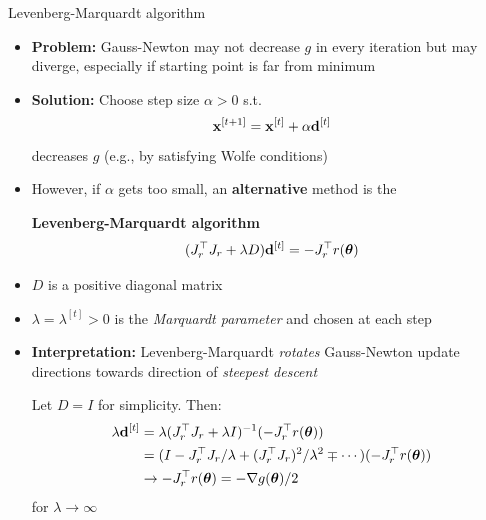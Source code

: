 \documentclass[11pt,compress,t,notes=noshow, xcolor=table]{beamer}
\begin{document}
\begin{vbframe}{Levenberg-Marquardt algorithm}

\begin{itemize}
    \item \textbf{Problem:} Gauss-Newton may not decrease $g$ in every iteration but may diverge, especially if starting point is far from minimum
    \item \textbf{Solution:} Choose step size $\alpha > 0$ s.t.
        \begin{equation*}
            \mathbf{x}^{[t+1]} = \mathbf{x}^{[t]} + \alpha \mathbf{d}^{[t]}
        \end{equation*}
        decreases $g$ (e.g., by satisfying Wolfe conditions)
    \item However, if $\alpha$ gets too small, an \textbf{alternative} method is the
        \begin{framed}
            \centering
            \textbf{Levenberg-Marquardt algorithm}
            \begin{equation*}
                (J_r^\top J_r + \lambda D) \mathbf{d}^{[t]} = -J_r^\top r(\bm{\theta})
            \end{equation*}
        \end{framed}
    \item $D$ is a positive diagonal matrix
    \item $\lambda = \lambda^{[t]} > 0$ is the \emph{Marquardt parameter} and chosen at each step
\end{itemize}

\framebreak

\begin{itemize}
    \item \textbf{Interpretation:} Levenberg-Marquardt \emph{rotates} Gauss-Newton update directions towards direction of \emph{steepest descent}
        \begin{framed}
            Let $D = I$ for simplicity.
            Then:
            \begin{align*}
                \lambda \mathbf{d}^{[t]} &= \lambda (J_r^\top J_r + \lambda I)^{-1} (- J_r^\top r(\bm{\theta})) \\
                &= (I - J_r^\top J_r / \lambda + (J_r^\top J_r)^2 / \lambda^2 \mp \cdots) (- J_r^\top r(\bm{\theta})) \\
                &\to - J_r^\top r(\bm{\theta}) = - \nabla g(\bm{\theta}) / 2
            \end{align*}
            for $\lambda \to \infty$

            \medskip


\end{framed}
\end{itemize}
\end{vbframe}
\end{document}
